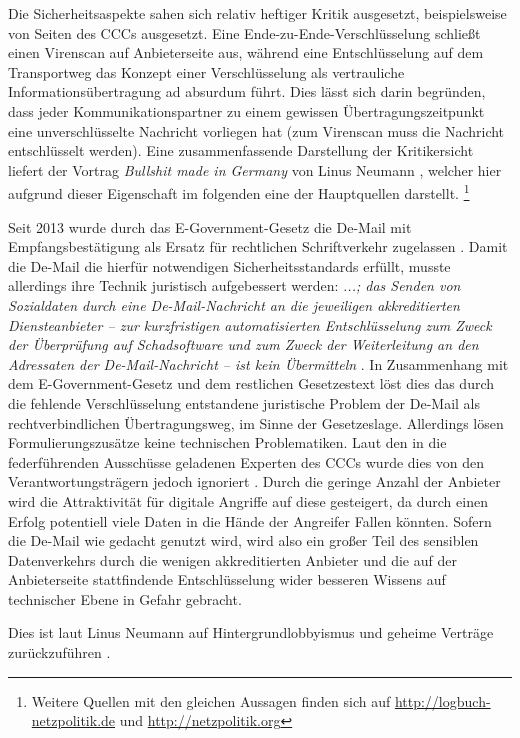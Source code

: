 \documentclass[
	12pt,
	a4paper,
	BCOR10mm,
	DIV14,
	listof=totoc,
	bibliography=totoc,
	headsepline
]{scrreprt}
\begin{document}
Die Sicherheitsaspekte sahen sich relativ heftiger Kritik ausgesetzt, beispielsweise von Seiten des CCCs ausgesetzt.
Eine Ende-zu-Ende-Verschlüsselung schließt einen Virenscan auf Anbieterseite aus, während eine Entschlüsselung auf dem Transportweg das Konzept einer Verschlüsselung als vertrauliche Informationsübertragung ad absurdum führt.
Dies lässt sich darin begründen, dass jeder Kommunikationspartner zu einem gewissen Übertragungszeitpunkt eine unverschlüsselte Nachricht vorliegen hat (zum Virenscan muss die Nachricht entschlüsselt werden).
Eine zusammenfassende Darstellung der Kritikersicht liefert der Vortrag \textit{Bullshit made in Germany} von Linus Neumann \cite{bsinger}, welcher hier aufgrund dieser Eigenschaft im folgenden eine der Hauptquellen darstellt. \footnote{Weitere Quellen mit den gleichen Aussagen finden sich auf \url{http://logbuch-netzpolitik.de} und \url{http://netzpolitik.org}}

Seit 2013 wurde durch das E-Government-Gesetz die De-Mail mit Empfangsbestätigung als Ersatz für rechtlichen Schriftverkehr zugelassen \cite{egov}.
Damit die De-Mail die hierfür notwendigen Sicherheitsstandards erfüllt, musste allerdings ihre Technik juristisch aufgebessert werden:
\textit{ ...; das Senden von Sozialdaten durch eine De-Mail-Nachricht an die jeweiligen akkreditierten Diensteanbieter – zur kurzfristigen automatisierten Entschlüsselung zum Zweck der Überprüfung auf Schadsoftware und zum Zweck der Weiterleitung an den Adressaten der De-Mail-Nachricht – ist kein Übermitteln\grqq} \cite{sozgesb10}.
In Zusammenhang mit dem E-Government-Gesetz und dem restlichen Gesetzestext löst dies das durch die fehlende Verschlüsselung entstandene juristische Problem der De-Mail als rechtverbindlichen Übertragungsweg, im Sinne der Gesetzeslage.
Allerdings lösen Formulierungszusätze keine technischen Problematiken. 
Laut den in die federführenden Ausschüsse geladenen Experten des CCCs wurde dies von den Verantwortungsträgern jedoch ignoriert \cite{bsinger}.
Durch die geringe Anzahl der Anbieter wird die Attraktivität für digitale Angriffe auf diese gesteigert, da durch einen Erfolg potentiell viele Daten in die Hände der Angreifer Fallen könnten.
Sofern die De-Mail wie gedacht genutzt wird, wird also ein großer Teil des sensiblen Datenverkehrs durch die wenigen akkreditierten Anbieter und die auf der Anbieterseite stattfindende Entschlüsselung wider besseren Wissens auf technischer Ebene in Gefahr gebracht.

Dies ist laut Linus Neumann auf Hintergrundlobbyismus und geheime Verträge zurückzuführen \cite{bsinger}.
\end{document}
